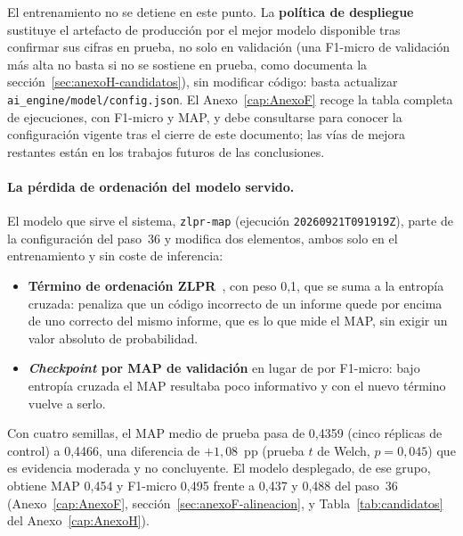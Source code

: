 El entrenamiento no se detiene en este punto. La \textbf{política de despliegue} sustituye el artefacto de producción por el mejor modelo disponible tras confirmar sus cifras en prueba, no solo en validación (una F1-micro de validación más alta no basta si no se sostiene en prueba, como documenta la sección~\ref{sec:anexoH-candidatos}), sin modificar código: basta actualizar \texttt{ai\_engine/model/config.json}. El Anexo~\ref{cap:AnexoF} recoge la tabla completa de ejecuciones, con F1-micro y MAP, y debe consultarse para conocer la configuración vigente tras el cierre de este documento; las vías de mejora restantes están en los trabajos futuros de las conclusiones.

\paragraph{La pérdida de ordenación del modelo servido.} El modelo que sirve el sistema, \texttt{zlpr-map} (ejecución \texttt{20260921T091919Z}), parte de la configuración del paso~36 y modifica dos elementos, ambos solo en el entrenamiento y sin coste de inferencia:

\begin{itemize}
 \item \textbf{Término de ordenación ZLPR}~\cite{su2022zlpr}, con peso 0,1, que se suma a la entropía cruzada: penaliza que un código incorrecto de un informe quede por encima de uno correcto del mismo informe, que es lo que mide el MAP, sin exigir un valor absoluto de probabilidad.
 \item \textbf{\emph{Checkpoint} por MAP de validación} en lugar de por F1-micro: bajo entropía cruzada el MAP resultaba poco informativo y con el nuevo término vuelve a serlo.
\end{itemize}

Con cuatro semillas, el MAP medio de prueba pasa de 0,4359 (cinco réplicas de control) a 0,4466, una diferencia de $+1{,}08$~pp (prueba $t$ de Welch, $p=0{,}045$) que es evidencia moderada y no concluyente. El modelo desplegado, de ese grupo, obtiene MAP 0,454 y F1-micro 0,495 frente a 0,437 y 0,488 del paso~36 (Anexo~\ref{cap:AnexoF}, sección~\ref{sec:anexoF-alineacion}, y Tabla~\ref{tab:candidatos} del Anexo~\ref{cap:AnexoH}).

